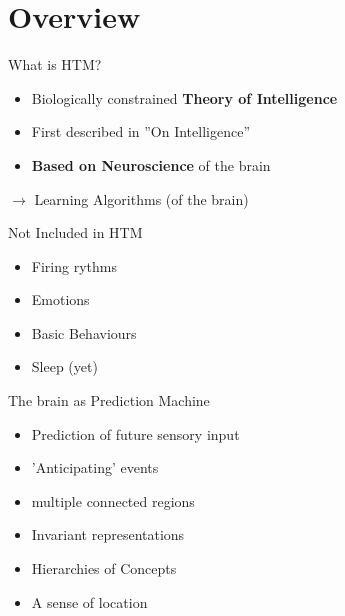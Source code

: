 \section{Overview}


\begin{frame}[c]{What is HTM?}
    \Large
    \begin{itemize}[<+(1)->]
        \item Biologically constrained \textbf{Theory of Intelligence}
        \item First described in ''On Intelligence''
        \item \textbf{Based on Neuroscience} of the brain
    \end{itemize}

    \vspace{0.5cm}

    \pause

    $\rightarrow$ Learning Algorithms \pause (of the brain)
\end{frame}




\begin{frame}[c]{Not Included in HTM}
    \Large
    \begin{itemize}[<+(1)->]
        \item Firing rythms
        \item Emotions
        \item Basic Behaviours
        \item Sleep (yet)
    \end{itemize}
\end{frame}


\begin{frame}[c]{The brain as Prediction Machine}
    \Large
    \begin{itemize}[<+(1)->]
        \item Prediction of future sensory input
        \item 'Anticipating' events
        \item multiple connected regions
        \item Invariant representations
        \item Hierarchies of Concepts
        \item A sense of location
    \end{itemize}
\end{frame}



